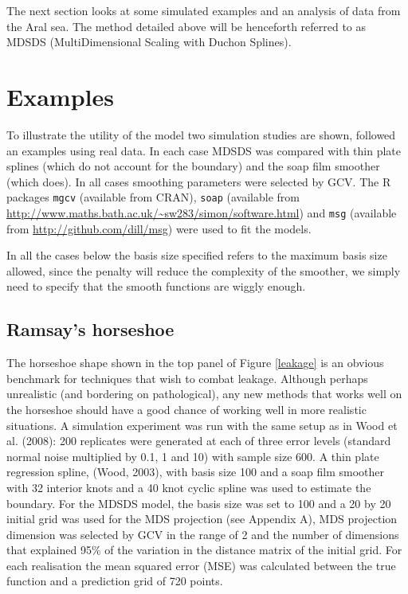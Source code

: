 \documentclass[useAMS, referee]{biom}
\begin{document}
The next section looks at some simulated examples and an analysis of data from the Aral sea. The method detailed above will be henceforth referred to as MDSDS (MultiDimensional Scaling with Duchon Splines).

\section{Examples}
\label{examples}

To illustrate the utility of the model two simulation studies are shown, followed an examples using real data. In each case MDSDS was compared with thin plate splines (which do not account for the boundary) and the soap film smoother (which does). In all cases smoothing parameters were selected by GCV. The \textsf{R} packages \texttt{mgcv} (available from CRAN), \texttt{soap} (available from \url{http://www.maths.bath.ac.uk/~sw283/simon/software.html}) and \texttt{msg} (available from \url{http://github.com/dill/msg}) were used to fit the models.

In all the cases below the basis size specified refers to the maximum basis size allowed, since the penalty will reduce the complexity of the smoother, we simply need to specify that the smooth functions are wiggly enough.

\subsection{Ramsay's horseshoe}

The horseshoe shape shown in the top panel of Figure \ref{leakage} is an obvious benchmark for techniques that wish to combat leakage. Although perhaps unrealistic (and bordering on pathological), any new methods that works well on the horseshoe should have a good chance of working well in more realistic situations. A simulation experiment was run with the same setup as in Wood et al. (2008): 200 replicates were generated at each of three error levels (standard normal noise multiplied by 0.1, 1 and 10) with sample size 600. A thin plate regression spline, (Wood, 2003), with basis size 100 and a soap film smoother with 32 interior knots  and a 40 knot cyclic  spline was used to estimate the boundary. For the MDSDS model, the basis size was set to 100 and a 20 by 20 initial grid was used for the MDS projection (see Appendix A), MDS projection dimension was selected by GCV in the range of 2 and the number of dimensions that explained 95\% of the variation in the distance matrix of the initial grid. For each realisation the mean squared error (MSE) was calculated between the true function and a prediction grid of 720 points.
\end{document}
